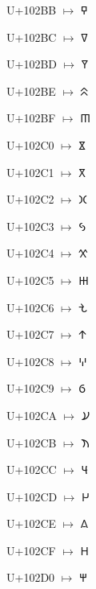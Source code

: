 {\noindent U+102BB $\mapsto$ {\ftcafont 𐊻}\par
\noindent U+102BC $\mapsto$ {\ftcafont 𐊼}\par
\noindent U+102BD $\mapsto$ {\ftcafont 𐊽}\par
\noindent U+102BE $\mapsto$ {\ftcafont 𐊾}\par
\noindent U+102BF $\mapsto$ {\ftcafont 𐊿}\par
\noindent U+102C0 $\mapsto$ {\ftcafont 𐋀}\par
\noindent U+102C1 $\mapsto$ {\ftcafont 𐋁}\par
\noindent U+102C2 $\mapsto$ {\ftcafont 𐋂}\par
\noindent U+102C3 $\mapsto$ {\ftcafont 𐋃}\par
\noindent U+102C4 $\mapsto$ {\ftcafont 𐋄}\par
\noindent U+102C5 $\mapsto$ {\ftcafont 𐋅}\par
\noindent U+102C6 $\mapsto$ {\ftcafont 𐋆}\par
\noindent U+102C7 $\mapsto$ {\ftcafont 𐋇}\par
\noindent U+102C8 $\mapsto$ {\ftcafont 𐋈}\par
\noindent U+102C9 $\mapsto$ {\ftcafont 𐋉}\par
\noindent U+102CA $\mapsto$ {\ftcafont 𐋊}\par
\noindent U+102CB $\mapsto$ {\ftcafont 𐋋}\par
\noindent U+102CC $\mapsto$ {\ftcafont 𐋌}\par
\noindent U+102CD $\mapsto$ {\ftcafont 𐋍}\par
\noindent U+102CE $\mapsto$ {\ftcafont 𐋎}\par
\noindent U+102CF $\mapsto$ {\ftcafont 𐋏}\par
\noindent U+102D0 $\mapsto$ {\ftcafont 𐋐}\par
}

